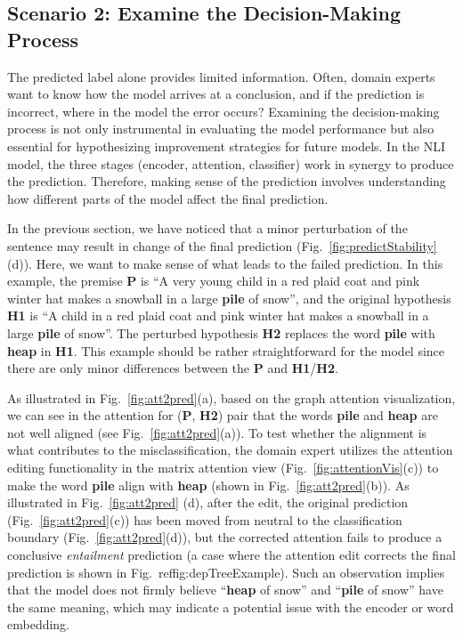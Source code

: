\subsection{Scenario 2: Examine the Decision-Making Process}
The predicted label alone provides limited information. Often, domain experts want to know how the model arrives at a conclusion, and if the prediction is incorrect, where in the model the error occurs?
Examining the decision-making process is not only instrumental in evaluating the model performance but also essential for hypothesizing improvement strategies for future models.
%
In the NLI model, the three stages (encoder, attention, classifier) work in synergy to produce the prediction.
Therefore, making sense of the prediction involves understanding how different parts of the model affect the final prediction.

In the previous section, we have noticed that a minor perturbation of the sentence may result in change of the final prediction (Fig.~\ref{fig:predictStability}(d)). Here, we want to make sense of what leads to the failed prediction. In this example, the premise \textbf{P} is ``A very young child in a red plaid coat and pink winter hat makes a snowball in a large \textbf{pile} of snow'', and the original hypothesis \textbf{H1} is ``A child in a red plaid coat and pink winter hat makes a snowball in a large \textbf{pile} of snow''. The perturbed hypothesis \textbf{H2} replaces the word \textbf{pile} with \textbf{heap} in \textbf{H1}. This example should be rather straightforward for the model since there are only minor differences between the \textbf{P} and \textbf{H1}/\textbf{H2}.

As illustrated in Fig.~\ref{fig:att2pred}(a), based on the graph attention visualization, we can see in the attention for (\textbf{P}, \textbf{H2}) pair that the words \textbf{pile} and \textbf{heap} are not well aligned (see Fig.~\ref{fig:att2pred}(a)).
%
To test whether the alignment is what contributes to the misclassification, the domain expert utilizes the attention editing functionality in the matrix attention view (Fig.~\ref{fig:attentionVis}(c)) to make the word \textbf{pile} align with \textbf{heap} (shown in Fig.~\ref{fig:att2pred}(b)).
%
As illustrated in Fig.~\ref{fig:att2pred} (d), after the edit, the original prediction (Fig.~\ref{fig:att2pred}(c)) has been moved from neutral to the classification boundary (Fig.~\ref{fig:att2pred}(d)), but the corrected attention fails to produce a conclusive \emph{entailment} prediction (a case where the attention edit corrects the final prediction is shown in Fig.~ref{fig:depTreeExample}).
%
Such an observation implies that the model does not firmly believe ``\textbf{heap} of snow'' and ``\textbf{pile} of snow'' have the same meaning, which may indicate a potential issue with the encoder or word embedding.


